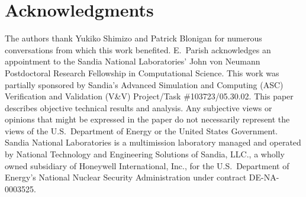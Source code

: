 \documentclass[3p,computermodern,10pt]{elsarticle}
\begin{document}
\section{Acknowledgments}
The authors thank Yukiko Shimizo and Patrick Blonigan for numerous conversations from which this work benefited. 
E.\ Parish acknowledges an appointment to the Sandia National Laboratories'
John von Neumann Postdoctoral Research Fellowship in Computational Science. 
This work was partially sponsored by Sandia's Advanced Simulation and
Computing (ASC) Verification and Validation (V\&V) Project/Task
\#103723/05.30.02.  This paper describes objective technical results and
analysis. Any subjective views or opinions that might be expressed in the
paper do not necessarily represent the views of the U.S.\ Department of Energy
or the United States Government.  Sandia National Laboratories is a
multimission laboratory managed and operated by National Technology and
Engineering Solutions of Sandia, LLC., a wholly owned subsidiary of Honeywell
International, Inc., for the U.S.\  Department of Energy's National Nuclear
Security Administration under contract DE-NA-0003525.
\end{document}
